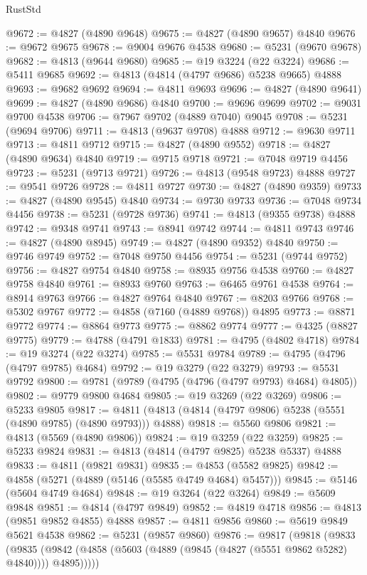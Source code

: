 \begin{lexlean}{RustStd}
\begin{coremodule}
@9672 := @4827 (@4890 @9648)
@9675 := @4827 (@4890 @9657) @4840
@9676 := @9672 @9675
@9678 := @9004 @9676 @4538
@9680 := @5231 (@9670 @9678)
@9682 := @4813 (@9644 @9680)
@9685 := @19 @3224 (@22 @3224)
@9686 := @5411 @9685
@9692 := @4813 (@4814 (@4797 @9686) @5238 @9665) @4888
@9693 := @9682 @9692
@9694 := @4811 @9693
@9696 := @4827 (@4890 @9641)
@9699 := @4827 (@4890 @9686) @4840
@9700 := @9696 @9699
@9702 := @9031 @9700 @4538
@9706 := @7967 @9702 (@4889 @7040) @9045
@9708 := @5231 (@9694 @9706)
@9711 := @4813 (@9637 @9708) @4888
@9712 := @9630 @9711
@9713 := @4811 @9712
@9715 := @4827 (@4890 @9552)
@9718 := @4827 (@4890 @9634) @4840
@9719 := @9715 @9718
@9721 := @7048 @9719 @4456
@9723 := @5231 (@9713 @9721)
@9726 := @4813 (@9548 @9723) @4888
@9727 := @9541 @9726
@9728 := @4811 @9727
@9730 := @4827 (@4890 @9359)
@9733 := @4827 (@4890 @9545) @4840
@9734 := @9730 @9733
@9736 := @7048 @9734 @4456
@9738 := @5231 (@9728 @9736)
@9741 := @4813 (@9355 @9738) @4888
@9742 := @9348 @9741
@9743 := @8941 @9742
@9744 := @4811 @9743
@9746 := @4827 (@4890 @8945)
@9749 := @4827 (@4890 @9352) @4840
@9750 := @9746 @9749
@9752 := @7048 @9750 @4456
@9754 := @5231 (@9744 @9752)
@9756 := @4827 @9754 @4840
@9758 := @8935 @9756 @4538
@9760 := @4827 @9758 @4840
@9761 := @8933 @9760
@9763 := @6465 @9761 @4538
@9764 := @8914 @9763
@9766 := @4827 @9764 @4840
@9767 := @8203 @9766
@9768 := @5302 @9767
@9772 := @4858 (@7160 (@4889 @9768)) @4895
@9773 := @8871 @9772
@9774 := @8864 @9773
@9775 := @8862 @9774
@9777 := @4325 (@8827 @9775)
@9779 := @4788 (@4791 @1833)
@9781 := @4795 (@4802 @4718)
@9784 := @19 @3274 (@22 @3274)
@9785 := @5531 @9784
@9789 := @4795 (@4796 (@4797 @9785) @4684)
@9792 := @19 @3279 (@22 @3279)
@9793 := @5531 @9792
@9800 := @9781 (@9789 (@4795 (@4796 (@4797 @9793) @4684) @4805))
@9802 := @9779 @9800 @4684
@9805 := @19 @3269 (@22 @3269)
@9806 := @5233 @9805
@9817 := @4811 (@4813 (@4814 (@4797 @9806) @5238 (@5551 (@4890 @9785) (@4890 @9793))) @4888)
@9818 := @5560 @9806
@9821 := @4813 (@5569 (@4890 @9806))
@9824 := @19 @3259 (@22 @3259)
@9825 := @5233 @9824
@9831 := @4813 (@4814 (@4797 @9825) @5238 @5337) @4888
@9833 := @4811 (@9821 @9831)
@9835 := @4853 (@5582 @9825)
@9842 := @4858 (@5271 (@4889 (@5146 (@5585 @4749 @4684) @5457)))
@9845 := @5146 (@5604 @4749 @4684)
@9848 := @19 @3264 (@22 @3264)
@9849 := @5609 @9848
@9851 := @4814 (@4797 @9849)
@9852 := @4819 @4718
@9856 := @4813 (@9851 @9852 @4855) @4888
@9857 := @4811 @9856
@9860 := @5619 @9849 @5621 @4538
@9862 := @5231 (@9857 @9860)
@9876 := @9817
    (@9818
      (@9833
        (@9835 (@9842 (@4858 (@5603 (@4889 (@9845 (@4827 (@5551 @9862 @5282) @4840)))) @4895)))))

\end{coremodule}
\end{lexlean}
